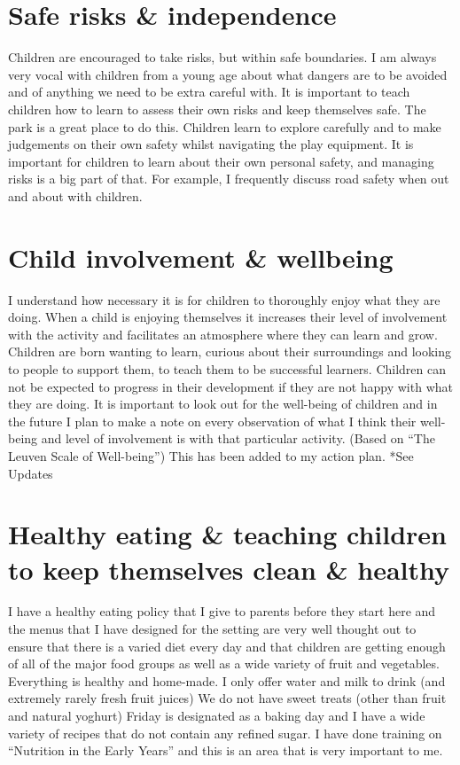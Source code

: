 \documentclass[10pt,a4paper]{report}
\begin{document}
\section{Safe risks \& independence}

Children are encouraged to take risks, but within safe boundaries. I am always very vocal with children from a young age about what dangers are to be avoided and of anything we need to be extra careful with. It is important to teach children how to learn to assess their own risks and keep themselves safe. The park is a great place to do this. Children learn to explore carefully and to make judgements on their own safety whilst navigating the play equipment. It is important for children to learn about their own personal safety, and managing risks is a big part of that. For example, I frequently discuss road safety when out and about with children. 

\section{Child involvement \& wellbeing}

I understand how necessary it is for children to thoroughly enjoy what they are doing. When a child is enjoying themselves it increases their level of involvement with the activity and facilitates an atmosphere where they can learn and grow. Children are born wanting to learn, curious about their surroundings and looking to people to support them, to teach them to be successful learners. Children can not be expected to progress in their development if they are not happy with what they are doing. It is important to look out for the well-being of children and in the future I plan to make a note on every observation of what I think their well-being and level of involvement is with that particular activity. (Based on “The Leuven Scale of Well-being”) This has been added to my action plan. *See Updates

\section{Healthy eating \& teaching children to keep themselves clean \& healthy}

I have a healthy eating policy that I give to parents before they start here and the menus that I have designed for the setting are very well thought out to ensure that there is a varied diet every day and that children are getting enough of all of the major food groups as well as a wide variety of fruit and vegetables. Everything is healthy and home-made. I only offer water and milk to drink (and extremely rarely fresh fruit juices) We do not have sweet treats (other than fruit and natural yoghurt) Friday is designated as a baking day and I have a wide variety of recipes that do not contain any refined sugar. I have done training on “Nutrition in the Early Years” and this is an area that is very important to me. 
\end{document}
